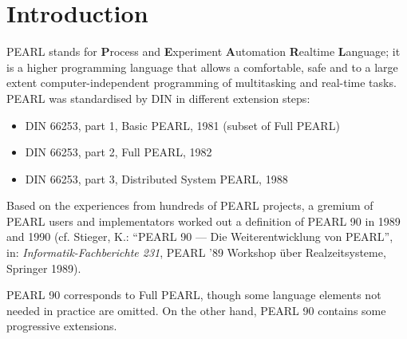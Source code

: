 \chapter{Introduction}   %

%
%


PEARL stands for {\bf P}rocess and {\bf E}xperiment {\bf A}utomation
{\bf R}ealtime {\bf L}anguage; it is a higher programming language that
allows a comfortable, safe and to a large extent computer-independent
programming of multitasking and real-time tasks. PEARL was standardised 
by DIN in different extension steps:

\begin{itemize}
\item DIN 66253, part 1, Basic PEARL, 1981 (subset of Full PEARL)
\item DIN 66253, part 2, Full PEARL, 1982
\item DIN 66253, part 3, Distributed System PEARL, 1988
\end{itemize}

Based on the experiences from hundreds of PEARL projects, a gremium of
PEARL users and implementators worked out a definition of PEARL 90 in
1989 and 1990 (cf. Stieger, K.: ``PEARL 90 --- Die Weiterentwicklung von
PEARL'', in: {\em Informatik-Fachberichte 231}, PEARL '89 Workshop
\"uber Realzeitsysteme, Springer 1989).

PEARL 90 corresponds to Full PEARL, though some language elements not
needed in practice are omitted. On the other hand, PEARL 90 contains
some progressive extensions.

